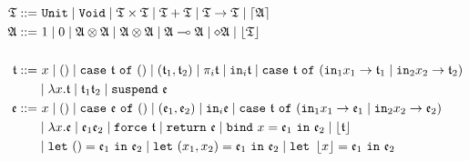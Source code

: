 \begin{align*}
    \T ::=&~ \mathtt{Unit} \mid \mathtt{Void} \mid \T \times \T \mid \T + \T \mid \T \rightarrow \T \mid \ceil{\A} \\
    \A ::=&~ 1 \mid 0 \mid \A \otimes \A \mid \A \otimes \A \mid \A \multimap \A \mid \diamond\A \mid \floor{\T} \\
    \\
    \t ::=&~ x \mid () \mid \mathtt{case}~\t~\mathtt{of}~() \mid (\t_1, \t_2) \mid \pi_i \t \mid \mathtt{in}_i \t \mid \mathtt{case}~\t~\mathtt{of}~(\mathtt{in}_1 x_1 \rightarrow \t_1 \mid \mathtt{in}_2 x_2 \rightarrow \t_2) \\
    & \mid \lambda x. \t \mid \t_1 \t_2 \mid \mathtt{suspend}~\e \\
    \e ::=&~ x \mid () \mid \mathtt{case}~\e~\mathtt{of}~() \mid (\e_1, \e_2) \mid \mathtt{in}_i \e \mid \mathtt{case}~\t~\mathtt{of}~(\mathtt{in}_1 x_1 \rightarrow \e_1 \mid \mathtt{in}_2 x_2 \rightarrow \e_2) \\
    & \mid \lambda x. \e \mid \e_1 \e_2 \mid \mathtt{force}~\t \mid \mathtt{return}~\e \mid \mathtt{bind}~x = \e_1~\mathtt{in}~\e_2 \mid \floor{\t} \\
    &\mid \mathtt{let}~() = \e_1~\mathtt{in}~\e_2 \mid \mathtt{let}~(x_1, x_2) = \e_1~\mathtt{in}~\e_2 \mid \mathtt{let}~\floor{x} = \e_1~\mathtt{in}~\e_2
\end{align*}

